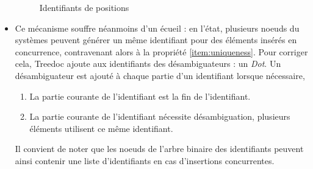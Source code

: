 \begin{itemize}
\begin{figure}[!ht]
      \centering
      \caption{Identifiants de positions}
      \label{fig:treedoc-ids}
    \end{figure}
  \item Ce mécanisme souffre néanmoins d'un écueil : en l'état, plusieurs noeuds du systèmes peuvent générer un même identifiant pour des éléments insérés en concurrence, contravenant alors à la propriété \ref{item:uniqueness}.
    Pour corriger cela, Treedoc ajoute aux identifiants des désambiguateurs : un \emph{Dot}.
    Un désambiguateur est ajouté à chaque partie d'un identifiant lorsque nécessaire, \ie
    \begin{enumerate}[label=(\roman*)]
      \item La partie courante de l'identifiant est la fin de l'identifiant.
      \item La partie courante de l'identifiant nécessite désambiguation, \ie plusieurs éléments utilisent ce même identifiant.
    \end{enumerate}
    Il convient de noter que les noeuds de l'arbre binaire des identifiants peuvent ainsi contenir une liste d'identifiants en cas d'insertions concurrentes.
    \begin{figure}[!ht]

      \centering
\end{figure}
\end{itemize}
